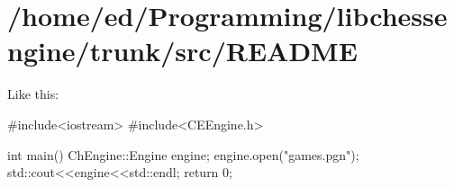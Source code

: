 \hypertarget{_2home_2ed_2Programming_2libchessengine_2trunk_2src_2README-example}{
\section{/home/ed/Programming/libchessengine/trunk/src/README}
}
Like this: 
\begin{DoxyCode}
                    #include<iostream>
                    #include<CEEngine.h>

                    int main()
                    {
                        ChEngine::Engine engine;
                        engine.open("games.pgn");
                        std::cout<<engine<<std::endl;
                        return 0;
                    }
\end{DoxyCode}



\begin{DoxyCodeInclude}
\end{DoxyCodeInclude}
 